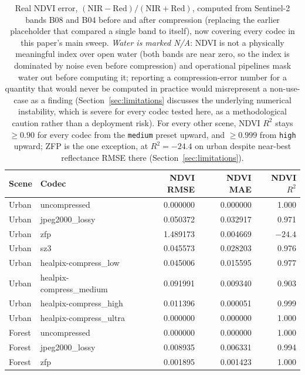\begin{table}[t]
\centering
\caption{Real NDVI error, $(\mathrm{NIR}-\mathrm{Red})/(\mathrm{NIR}+\mathrm{Red})$, computed from Sentinel-2 bands B08 and B04 before and after compression (replacing the earlier placeholder that compared a single band to itself), now covering every codec in this paper's main sweep. \emph{Water is marked N/A}: NDVI is not a physically meaningful index over open water (both bands are near zero, so the index is dominated by noise even before compression) and operational pipelines mask water out before computing it; reporting a compression-error number for a quantity that would never be computed in practice would misrepresent a non-use-case as a finding (Section~\ref{sec:limitations} discusses the underlying numerical instability, which is severe for every codec tested here, as a methodological caution rather than a deployment risk). For every other scene, NDVI $R^2$ stays $\geq 0.90$ for every codec from the \texttt{medium} preset upward, and $\geq 0.999$ from \texttt{high} upward; ZFP is the one exception, at $R^2=-24.4$ on urban despite near-best reflectance RMSE there (Section~\ref{sec:limitations}).}
\label{tab:ndvi_real}
\begin{tabular}{@{}llrrr@{}}
\toprule
Scene & Codec & NDVI RMSE & NDVI MAE & NDVI $R^2$ \\
\midrule
Urban       & uncompressed             & 0.000000 & 0.000000 & 1.000 \\
Urban       & jpeg2000\_lossy          & 0.050372 & 0.032917 & 0.971 \\
Urban       & zfp                      & 1.489173 & 0.004669 & $-24.4$ \\
Urban       & sz3                      & 0.045573 & 0.028203 & 0.976 \\
Urban       & healpix-compress\_low    & 0.045006 & 0.015595 & 0.977 \\
Urban       & healpix-compress\_medium & 0.091991 & 0.009340 & 0.903 \\
Urban       & healpix-compress\_high   & 0.011396 & 0.000051 & 0.999 \\
Urban       & healpix-compress\_ultra  & 0.000000 & 0.000000 & 1.000 \\
\addlinespace
Forest      & uncompressed             & 0.000000 & 0.000000 & 1.000 \\
Forest      & jpeg2000\_lossy          & 0.008935 & 0.006331 & 0.994 \\
Forest      & zfp                      & 0.001895 & 0.001423 & 1.000 \\

\end{tabular}
\end{table}
